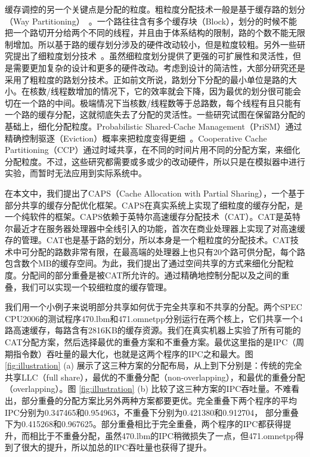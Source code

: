 缓存调控的另一个关键点是分配的粒度。粗粒度分配技术一般是基于缓存路的划分（Way Partitioning）~\parencite{suh2004dynamic,qureshi2006utility,qureshi2007adaptive,hsu2006communist,iyer2004cqos,kim2004fair,rafique2006architectural,xie2009pipp}。一个路往往含有多个缓存块（Block），划分的时候不能把一个路切开分给两个不同的线程，并且由于体系结构的限制，路的个数不能无限制增加。所以基于路的缓存划分涉及的硬件改动较小，但是粒度较粗。另外一些研究提出了细粒度划分技术~\parencite{sanchez2011vantage,manikantan2012probabilistic,chang2014cooperative}。虽然细粒度划分提供了更强的可扩展性和灵活性，但是需要更加复杂的设计和更多的硬件改动。考虑到设计的简洁性，大部分研究还是采用了粗粒度的路划分技术。正如前文所说，路划分下分配的最小单位是路的大小。在核数/线程数增加的情况下，它的效率就会下降，因为最优的划分很可能会切在一个路的中间。极端情况下当核数/线程数等于总路数，每个线程有且只能有一个路的缓存分配，这就彻底失去了分配的灵活性。一些研究试图在保留路分配的基础上，细化分配粒度。Probabilistic Shared-Cache Management（PriSM）通过精确控制驱逐（Eviction）概率来把粒度变得更细~\parencite{manikantan2012probabilistic}。Cooperative Cache Partitioning（CCP）通过时域共享，在不同的时间片用不同的分配方案，来细化分配粒度。不过，这些研究都需要或多或少的改动硬件，所以只是在模拟器中进行实验，而暂时无法应用到实际系统中。

在本文中，我们提出了CAPS（Cache Allocation with Partial Sharing），一个基于部分共享的缓存分配优化框架。CAPS在真实系统上实现了细粒度的缓存分配，是一个纯软件的框架。CAPS依赖于英特尔高速缓存分配技术（CAT）。CAT是英特尔最近才在服务器处理器中全线引入的功能，首次在商业处理器上实现了对高速缓存的管理。CAT也是基于路的划分，所以本身是一个粗粒度的分配技术。CAT技术中可分配的路数非常有限，在最高端的处理器上也只有20个路可供分配，每个路包含数个MB的缓存空间。为此，我们提出了通过空间共享的方式来细化分配粒度。分配间的部分重叠是被CAT所允许的。通过精确地控制分配以及之间的重叠，我们可以实现一个较细粒度的缓存管理。

我们用一个小例子来说明部分共享如何优于完全共享和不共享的分配。两个SPEC CPU2006的测试程序470.lbm和471.omnetpp分别运行在两个核上，它们共享一个4路高速缓存，每路含有2816KB的缓存资源。我们在真实机器上实验了所有可能的CAT分配方案，然后选择最优的重叠方案和不重叠方案。最优这里指的是IPC（周期指令数）吞吐量的最大化，也就是这两个程序的IPC之和最大。图 \ref{fig:illustration} (a) 展示了这三种方案的分配布局，从上到下分别是：传统的完全共享LLC（full share），最优的不重叠分配（non-overlapping），和最优的重叠分配（overlapping）。图 \ref{fig:illustration} (b) 比较了这三种方案的IPC吞吐量。不难看出，部分重叠的分配方案比另外两种方案都要更优。完全重叠下两个程序的平均IPC分别为0.347465和0.954963，不重叠下分别为0.421380和0.912704， 部分重叠下为0.415268和0.967625。部分重叠相比于完全重叠，两个程序的IPC都获得提升，而相比于不重叠分配，虽然470.lbm的IPC稍微损失了一点，但471.omnetpp得到了很大的提升，所以加总的IPC吞吐量也获得了提升。

